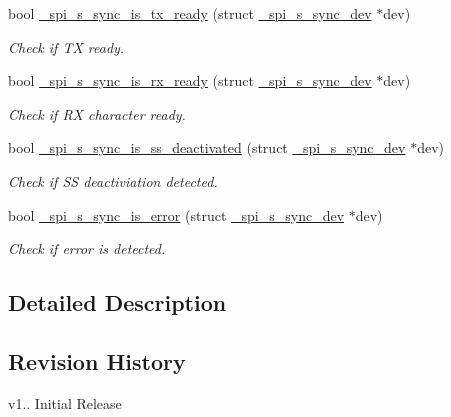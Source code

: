 \begin{DoxyCompactItemize}
bool \hyperlink{group__hpl__spi_ga96d0ba31c615fdd4340205bc27106df8}{\+\_\+spi\+\_\+s\+\_\+sync\+\_\+is\+\_\+tx\+\_\+ready} (struct \hyperlink{group__hpl__spi_ga36cf082f9d7764b69f43a52f039e7165}{\+\_\+spi\+\_\+s\+\_\+sync\+\_\+dev} $\ast$dev)
\begin{DoxyCompactList}\small\item\em Check if TX ready. \end{DoxyCompactList}\item 
bool \hyperlink{group__hpl__spi_ga632f8c72ffd769bc392e730e0ad805d8}{\+\_\+spi\+\_\+s\+\_\+sync\+\_\+is\+\_\+rx\+\_\+ready} (struct \hyperlink{group__hpl__spi_ga36cf082f9d7764b69f43a52f039e7165}{\+\_\+spi\+\_\+s\+\_\+sync\+\_\+dev} $\ast$dev)
\begin{DoxyCompactList}\small\item\em Check if RX character ready. \end{DoxyCompactList}\item 
bool \hyperlink{group__hpl__spi_gaa51db7f4f9251689e45272535b1f2051}{\+\_\+spi\+\_\+s\+\_\+sync\+\_\+is\+\_\+ss\+\_\+deactivated} (struct \hyperlink{group__hpl__spi_ga36cf082f9d7764b69f43a52f039e7165}{\+\_\+spi\+\_\+s\+\_\+sync\+\_\+dev} $\ast$dev)
\begin{DoxyCompactList}\small\item\em Check if SS deactiviation detected. \end{DoxyCompactList}\item 
bool \hyperlink{group__hpl__spi_ga8a55be7580939b887c193397e632d3f2}{\+\_\+spi\+\_\+s\+\_\+sync\+\_\+is\+\_\+error} (struct \hyperlink{group__hpl__spi_ga36cf082f9d7764b69f43a52f039e7165}{\+\_\+spi\+\_\+s\+\_\+sync\+\_\+dev} $\ast$dev)
\begin{DoxyCompactList}\small\item\em Check if error is detected. \end{DoxyCompactList}\end{DoxyCompactItemize}


\subsection{Detailed Description}
\hypertarget{group__hpl__spi_hpl_spi_rev}{}\subsection{Revision History}\label{group__hpl__spi_hpl_spi_rev}

\begin{DoxyItemize}
\item v1.. Initial Release 
\end{DoxyItemize}

